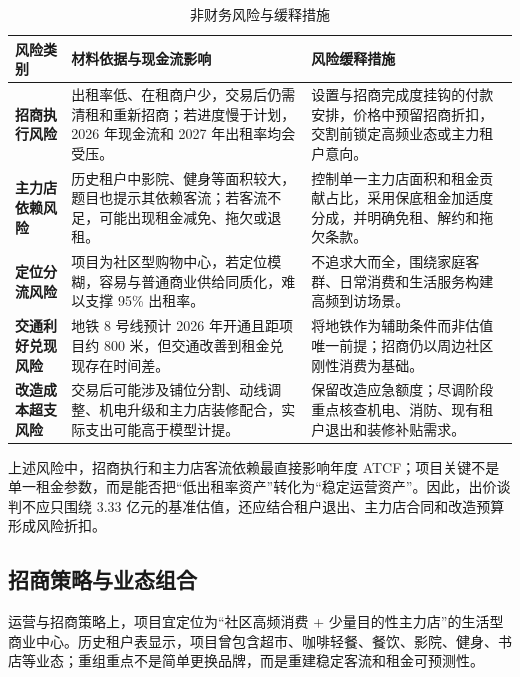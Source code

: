 \documentclass[11pt,a4paper]{ctexart}
\begin{document}
\begin{table}[H]
  \centering
  \caption{非财务风险与缓释措施}
  \scriptsize
  \renewcommand{\arraystretch}{1.0}
  \begin{tabularx}{\textwidth}{>{\bfseries}p{2.35cm} X X}
    \toprule
    风险类别 & 材料依据与现金流影响 & 风险缓释措施 \\
    \midrule
    招商执行风险 & 出租率低、在租商户少，交易后仍需清租和重新招商；若进度慢于计划，2026 年现金流和 2027 年出租率均会受压。 & 设置与招商完成度挂钩的付款安排，价格中预留招商折扣，交割前锁定高频业态或主力租户意向。 \\
    主力店依赖风险 & 历史租户中影院、健身等面积较大，题目也提示其依赖客流；若客流不足，可能出现租金减免、拖欠或退租。 & 控制单一主力店面积和租金贡献占比，采用保底租金加适度分成，并明确免租、解约和拖欠条款。 \\
    定位分流风险 & 项目为社区型购物中心，若定位模糊，容易与普通商业供给同质化，难以支撑 95\% 出租率。 & 不追求大而全，围绕家庭客群、日常消费和生活服务构建高频到访场景。 \\
    交通利好兑现风险 & 地铁 8 号线预计 2026 年开通且距项目约 800 米，但交通改善到租金兑现存在时间差。 & 将地铁作为辅助条件而非估值唯一前提；招商仍以周边社区刚性消费为基础。 \\
    改造成本超支风险 & 交易后可能涉及铺位分割、动线调整、机电升级和主力店装修配合，实际支出可能高于模型计提。 & 保留改造应急额度；尽调阶段重点核查机电、消防、现有租户退出和装修补贴需求。 \\
    \bottomrule
  \end{tabularx}
\end{table}

上述风险中，招商执行和主力店客流依赖最直接影响年度 ATCF；项目关键不是单一租金参数，而是能否把“低出租率资产”转化为“稳定运营资产”。因此，出价谈判不应只围绕 3.33 亿元的基准估值，还应结合租户退出、主力店合同和改造预算形成风险折扣。

\subsection{招商策略与业态组合}

运营与招商策略上，项目宜定位为“社区高频消费 + 少量目的性主力店”的生活型商业中心。历史租户表显示，项目曾包含超市、咖啡轻餐、餐饮、影院、健身、书店等业态；重组重点不是简单更换品牌，而是重建稳定客流和租金可预测性。
\end{document}
